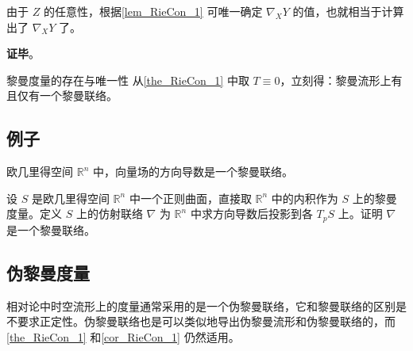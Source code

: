由于 $Z$ 的任意性，根据\autoref{lem_RieCon_1} 可唯一确定 $\nabla_XY$ 的值，也就相当于计算出了 $\nabla_XY$ 了。

\textbf{证毕}。

\begin{corollary}{黎曼度量的存在与唯一性}\label{cor_RieCon_1}
从\autoref{the_RieCon_1} 中取 $T\equiv 0$，立刻得：黎曼流形上有且仅有一个黎曼联络。
\end{corollary}

\subsection{例子}

\begin{example}{}
欧几里得空间 $\mathbb{R}^n$ 中，向量场的方向导数是一个黎曼联络。
\end{example}


\begin{exercise}{}
设 $S$ 是欧几里得空间 $\mathbb{R}^n$ 中一个正则曲面，直接取 $\mathbb{R}^n$ 中的内积作为 $S$ 上的黎曼度量。定义 $S$ 上的仿射联络 $\nabla$ 为 $\mathbb{R}^n$ 中求方向导数后投影到各 $T_pS$ 上。证明 $\nabla$ 是一个黎曼联络。
\end{exercise}

\subsection{伪黎曼度量}

相对论中时空流形上的度量通常采用的是一个伪黎曼联络，它和黎曼联络的区别是不要求正定性。伪黎曼联络也是可以类似地导出伪黎曼流形和伪黎曼联络的，而\autoref{the_RieCon_1} 和\autoref{cor_RieCon_1} 仍然适用。





